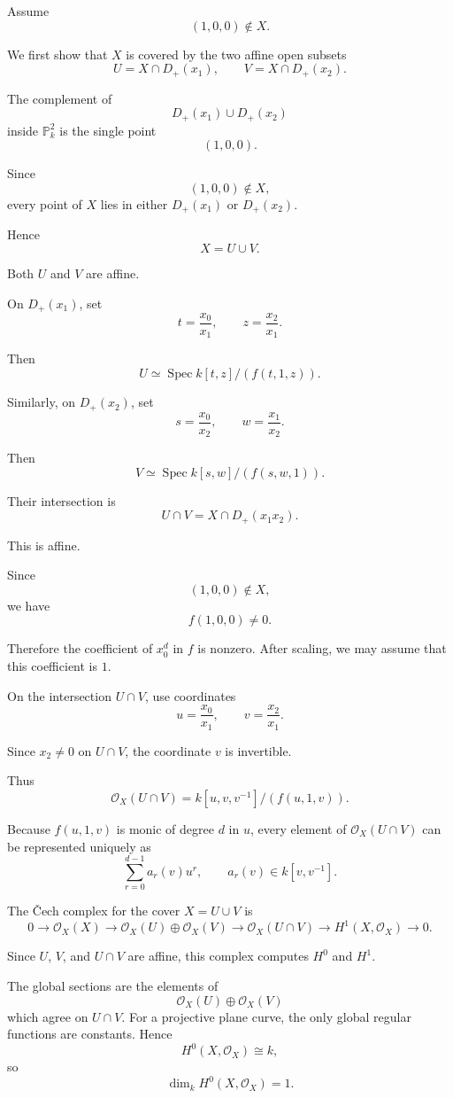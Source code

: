 \documentclass[12pt,a4paper]{article}
\theoremstyle{notespace}
\begin{document}
Assume
\[
(1,0,0)\notin X.
\]

We first show that \(X\) is covered by the two affine open subsets
\[
U=X\cap D_+(x_1),
\qquad
V=X\cap D_+(x_2).
\]

The complement of
\[
D_+(x_1)\cup D_+(x_2)
\]
inside \(\mathbb P_k^2\) is the single point
\[
(1,0,0).
\]

Since
\[
(1,0,0)\notin X,
\]
every point of \(X\) lies in either \(D_+(x_1)\) or \(D_+(x_2)\).

Hence
\[
X=U\cup V.
\]

Both \(U\) and \(V\) are affine.

On \(D_+(x_1)\), set
\[
t=\frac{x_0}{x_1},
\qquad
z=\frac{x_2}{x_1}.
\]

Then
\[
U\simeq \operatorname{Spec} k[t,z]/(f(t,1,z)).
\]

Similarly, on \(D_+(x_2)\), set
\[
s=\frac{x_0}{x_2},
\qquad
w=\frac{x_1}{x_2}.
\]

Then
\[
V\simeq \operatorname{Spec} k[s,w]/(f(s,w,1)).
\]

Their intersection is
\[
U\cap V=X\cap D_+(x_1x_2).
\]

This is affine.

Since
\[
(1,0,0)\notin X,
\]
we have
\[
f(1,0,0)\neq0.
\]

Therefore the coefficient of \(x_0^d\) in \(f\) is nonzero. After scaling,
we may assume that this coefficient is \(1\).

On the intersection \(U\cap V\), use coordinates
\[
u=\frac{x_0}{x_1},
\qquad
v=\frac{x_2}{x_1}.
\]

Since \(x_2\neq0\) on \(U\cap V\), the coordinate \(v\) is invertible.

Thus
\[
\mathcal O_X(U\cap V)
=
k[u,v,v^{-1}]/(f(u,1,v)).
\]

Because \(f(u,1,v)\) is monic of degree \(d\) in \(u\), every element of
\(\mathcal O_X(U\cap V)\) can be represented uniquely as
\[
\sum_{r=0}^{d-1} a_r(v)u^r,
\qquad
a_r(v)\in k[v,v^{-1}].
\]

The \v{C}ech complex for the cover \(X=U\cup V\) is
\[
0
\longrightarrow
\mathcal O_X(X)
\longrightarrow
\mathcal O_X(U)\oplus\mathcal O_X(V)
\longrightarrow
\mathcal O_X(U\cap V)
\longrightarrow
H^1(X,\mathcal O_X)
\longrightarrow0.
\]

Since \(U\), \(V\), and \(U\cap V\) are affine, this complex computes
\(H^0\) and \(H^1\).

The global sections are the elements of
\[
\mathcal O_X(U)\oplus\mathcal O_X(V)
\]
which agree on \(U\cap V\). For a projective plane curve, the only global
regular functions are constants. Hence
\[
H^0(X,\mathcal O_X)\cong k,
\]
so
\[
\boxed{
	\dim_k H^0(X,\mathcal O_X)=1.
}
\]
\end{document}
